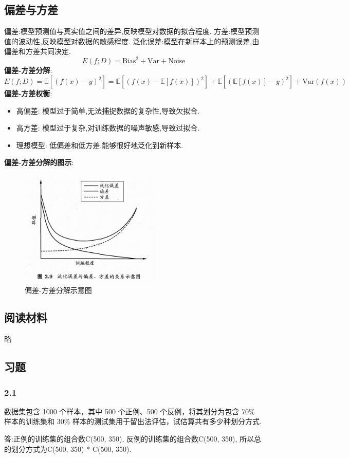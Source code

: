 \subsection{偏差与方差}
偏差:模型预测值与真实值之间的差异,反映模型对数据的拟合程度.
方差:模型预测值的波动性,反映模型对数据的敏感程度.
泛化误差:模型在新样本上的预测误差,由偏差和方差共同决定.
\begin{equation}
    E(f;D) = \text{Bias}^2 + \text{Var} + \text{Noise}
\end{equation}
\textbf{偏差-方差分解}:
\begin{equation}
    E(f;D) = \mathbb{E}[(f(x) - y)^2] = \mathbb{E}[(f(x) - \mathbb{E}[f(x)])^2] + \mathbb{E}[(\mathbb{E}[f(x)] - y)^2] + \text{Var}(f(x))
\end{equation}
\textbf{偏差-方差权衡}:
\begin{itemize}
    \item 高偏差: 模型过于简单,无法捕捉数据的复杂性,导致欠拟合.
    \item 高方差: 模型过于复杂,对训练数据的噪声敏感,导致过拟合.
    \item 理想模型: 低偏差和低方差,能够很好地泛化到新样本.
\end{itemize}
\textbf{偏差-方差分解的图示}:
\begin{figure}[H]
    \centering
    \includegraphics[width=0.6\textwidth]{static/images/偏差方差误差图.png}
    \caption{偏差-方差分解示意图}
    \label{fig:bias_variance_decomposition}
\end{figure}
\subsection{阅读材料}
略
\subsection{习题}
\subsubsection*{2.1}
数据集包含 1000 个样本，其中 500 个正例、500 个反例，将其划分为包含 70\% 样本的训练集和 30\% 样本的测试集用于留出法评估，试估算共有多少种划分方式.
\par 答:正例的训练集的组合数C(500, 350), 反例的训练集的组合数C(500, 350), 所以总的划分方式为C(500, 350) * C(500, 350).
